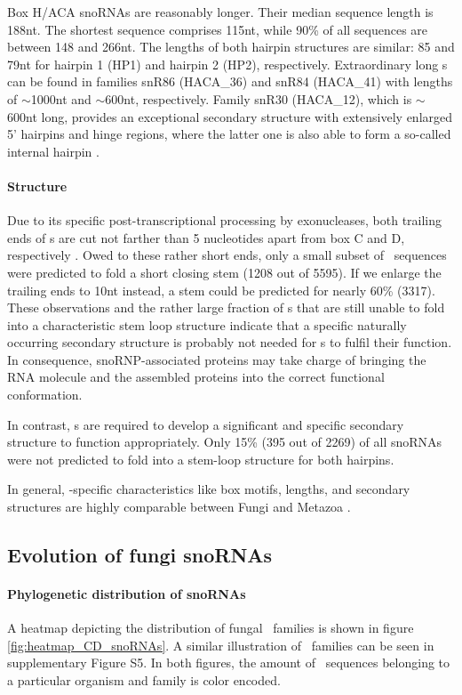 Box H/ACA snoRNAs are reasonably longer. Their
median sequence length is 188nt. The shortest sequence comprises 115nt, while 90\% of all sequences are between 148 and 266nt. 
The lengths of both hairpin structures are similar: 85 and 79nt for hairpin 1 (HP1) and hairpin 2 (HP2), respectively. 
Extraordinary long
\sno s can be found in families snR86 (HACA\_36) and snR84 (HACA\_41)
with lengths of $\sim$1000nt and $\sim$600nt, respectively. Family
snR30 (HACA\_12), which is $\sim$600nt long, provides an exceptional
secondary structure with extensively enlarged 5' hairpins and hinge
regions, where the latter one is also able to form a so-called
internal hairpin \citep{Fayet-Lebaron:2009}.


\paragraph{\textbf{Structure}} Due to its specific
post-transcriptional processing by exonucleases, both trailing ends of
\cd s are cut not farther than 5 nucleotides apart from box C and D,
respectively \citep{Kishore:2013}. Owed to these rather short ends,
only a small subset of \sno\ sequences were predicted to fold a short closing stem (1208 out of 5595). 
If we enlarge the trailing ends to 10nt instead, a stem could be predicted for nearly 60\% (3317). 
These observations and the rather large fraction of \sno s that are still unable to fold into a characteristic stem loop structure indicate that a specific naturally occurring secondary structure is probably not needed for \cd s to fulfil their function. 
In consequence, snoRNP-associated proteins may take charge of bringing the RNA molecule and the assembled proteins into the correct functional conformation.

In contrast, \haca s are required to develop a significant and specific secondary structure to function appropriately. Only 15\% (395 out of 2269) of all snoRNAs were not predicted to fold into a stem-loop structure for both hairpins. 

In general, \sno -specific characteristics like box motifs, lengths,
and secondary structures are highly comparable between Fungi and
Metazoa \cite{Kehr:2014}. 


\subsection{Evolution of fungi snoRNAs}
  
\paragraph{\textbf{Phylogenetic distribution of snoRNAs}}
A heatmap depicting the distribution of  fungal \cd\ families is shown
in figure \ref{fig:heatmap_CD_snoRNAs}. A similar illustration of
\haca\ families can be seen in supplementary Figure S5. In both figures, the
amount of \sno\ sequences belonging to a particular organism and
family is color encoded.

